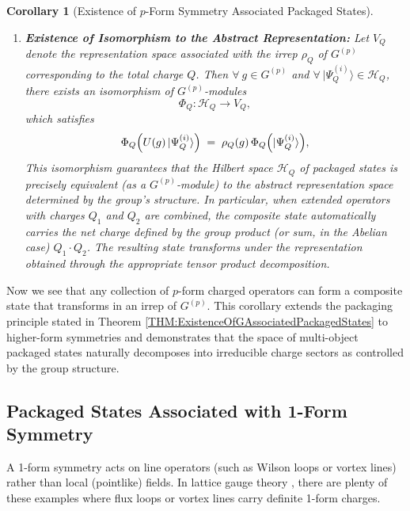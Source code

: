 \documentclass[12pt,a4paper]{article}
\newtheorem{corollary}{Corollary}
\begin{document}
\begin{corollary}[Existence of $p$-Form Symmetry Associated Packaged States]
\begin{enumerate}
		\item \textbf{Existence of Isomorphism to the Abstract Representation:}  
		Let $V_Q$ denote the representation space associated with the irrep $\rho_Q$ of $G^{(p)}$ corresponding to the total charge $Q$. Then $\forall~ g \in G^{(p)}$ and $\forall~ |\Psi_Q^{(i)}\rangle \in \mathcal{H}_Q$, there exists an isomorphism of $G^{(p)}$-modules
		\[
		\Phi_Q: \mathcal{H}_Q \to V_Q,
		\]
		which satisfies
		\[
		\Phi_Q\Bigl(U(g)\,|\Psi_Q^{(i)}\rangle\Bigr) \;=\; \rho_Q(g)\,\Phi_Q\Bigl(|\Psi_Q^{(i)}\rangle\Bigr),
		\]
		This isomorphism guarantees that the Hilbert space $\mathcal{H}_Q$ of packaged states is precisely equivalent (as a $G^{(p)}$-module) to the abstract representation space determined by the group's structure.
		In particular, when extended operators with charges $Q_1$ and $Q_2$ are combined, the composite state automatically carries the net charge defined by the group product (or sum, in the Abelian case) $Q_1 \cdot Q_2$.
		The resulting state transforms under the representation obtained through the appropriate tensor product decomposition.
	\end{enumerate}
\end{corollary}


Now we see that any collection of $p$-form charged operators can form a composite state that transforms in an irrep of $G^{(p)}$.
This corollary extends the packaging principle stated in Theorem \ref{THM:ExistenceOfGAssociatedPackagedStates} to higher-form symmetries and demonstrates that the space of multi-object packaged states naturally decomposes into irreducible charge sectors as controlled by the group structure.



\subsection{Packaged States Associated with 1-Form Symmetry}

A 1-form symmetry acts on line operators (such as Wilson loops or vortex lines) rather than local (pointlike) fields.
In lattice gauge theory \cite{Wilson1974,KogutSusskind1975,Zohar2016,Sala2018}, there are plenty of these examples where flux loops or vortex lines carry definite 1-form charges.
\end{document}

